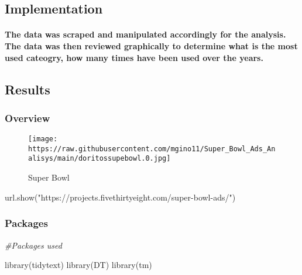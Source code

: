 \documentclass[
]{article}
\newenvironment{Shaded}{\begin{snugshade}}{\end{snugshade}}
\newcommand{\CommentTok}[1]{\textcolor[rgb]{0.56,0.35,0.01}{\textit{#1}}}
\newcommand{\FunctionTok}[1]{\textcolor[rgb]{0.00,0.00,0.00}{#1}}
\newcommand{\NormalTok}[1]{#1}
\newcommand{\StringTok}[1]{\textcolor[rgb]{0.31,0.60,0.02}{#1}}
\begin{document}
\hypertarget{implementation}{%
\subsection{Implementation}\label{implementation}}

\hypertarget{the-data-was-scraped-and-manipulated-accordingly-for-the-analysis.-the-data-was-then-reviewed-graphically-to-determine-what-is-the-most-used-cateogry-how-many-times-have-been-used-over-the-years.}{%
\paragraph{The data was scraped and manipulated accordingly for the
analysis. The data was then reviewed graphically to determine what is
the most used cateogry, how many times have been used over the
years.}\label{the-data-was-scraped-and-manipulated-accordingly-for-the-analysis.-the-data-was-then-reviewed-graphically-to-determine-what-is-the-most-used-cateogry-how-many-times-have-been-used-over-the-years.}}

\hypertarget{results}{%
\subsection{Results}\label{results}}

\hypertarget{overview}{%
\subsubsection{Overview}\label{overview}}

\begin{figure}
\centering
\texttt{[image: https://raw.githubusercontent.com/mgino11/Super\_Bowl\_Ads\_Analisys/main/doritossupebowl.0.jpg]}
\caption{Super Bowl}
\end{figure}

\begin{Shaded}
\begin{Highlighting}[]
\FunctionTok{url.show}\NormalTok{(}\StringTok{"https://projects.fivethirtyeight.com/super{-}bowl{-}ads/"}\NormalTok{)}
\end{Highlighting}
\end{Shaded}

\hypertarget{packages}{%
\subsubsection{Packages}\label{packages}}

\begin{Shaded}
\begin{Highlighting}[]
\CommentTok{\#Packages used}

\FunctionTok{library}\NormalTok{(tidytext)}
\FunctionTok{library}\NormalTok{(DT)}
\FunctionTok{library}\NormalTok{(tm)}
\end{Highlighting}
\end{Shaded}
\end{document}
